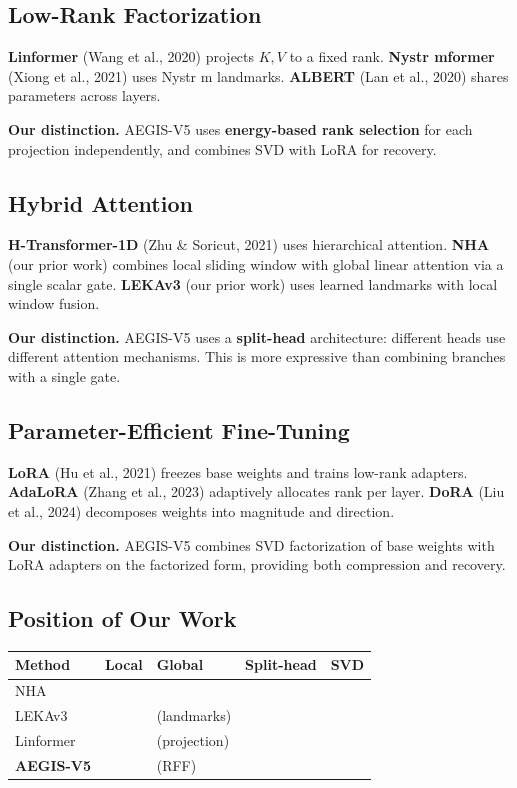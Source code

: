 \subsection{Low-Rank Factorization}

\textbf{Linformer} (Wang et al., 2020) projects $K, V$ to a fixed rank. 
\textbf{Nystr mformer} (Xiong et al., 2021) uses Nystr m landmarks. \textbf{ALBERT} 
(Lan et al., 2020) shares parameters across layers.

\textbf{Our distinction.} AEGIS-V5 uses \textbf{energy-based rank selection} for each 
projection independently, and combines SVD with LoRA for recovery.

\subsection{Hybrid Attention}

\textbf{H-Transformer-1D} (Zhu \& Soricut, 2021) uses hierarchical attention. 
\textbf{NHA} (our prior work) combines local sliding window with global linear 
attention via a single scalar gate. \textbf{LEKAv3} (our prior work) uses 
learned landmarks with local window fusion.

\textbf{Our distinction.} AEGIS-V5 uses a \textbf{split-head} architecture: different 
heads use different attention mechanisms. This is more expressive than 
combining branches with a single gate.

\subsection{Parameter-Efficient Fine-Tuning}

\textbf{LoRA} (Hu et al., 2021) freezes base weights and trains low-rank 
adapters. \textbf{AdaLoRA} (Zhang et al., 2023) adaptively allocates rank per 
layer. \textbf{DoRA} (Liu et al., 2024) decomposes weights into magnitude and 
direction.

\textbf{Our distinction.} AEGIS-V5 combines SVD factorization of base weights 
with LoRA adapters on the factorized form, providing both compression and 
recovery.

\subsection{Position of Our Work}

\begin{table}[H]
\centering
\small
\begin{tabular}{lllll}
\toprule
\textbf{Method} & \textbf{Local} & \textbf{Global} & \textbf{Split-head} & \textbf{SVD} \\
\midrule
NHA &  &  &  &  \\
LEKAv3 &  & (landmarks) &  &  \\
Linformer &  & (projection) &  &  \\
\textbf{AEGIS-V5} &  & (RFF) & \textbf{ } & \textbf{ } \\
\bottomrule
\end{tabular}
\end{table}

